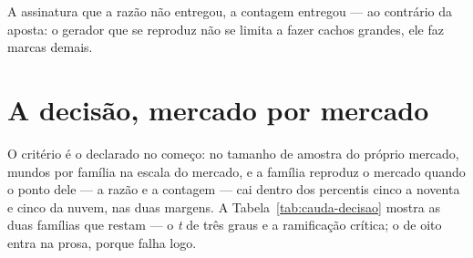 A assinatura que a razão não entregou, a contagem entregou --- ao contrário da aposta: o gerador
que se reproduz não se limita a fazer cachos grandes, ele faz marcas demais.

\section{A decisão, mercado por mercado}

O critério é o declarado no começo: no tamanho de amostra do próprio mercado, \numCaudaMundos{}
mundos por família na escala do mercado, e a família reproduz o mercado quando o ponto dele --- a
razão e a contagem --- cai dentro dos percentis cinco a noventa e cinco da nuvem, nas duas
margens. A Tabela~\ref{tab:cauda-decisao} mostra as duas famílias que restam --- o \emph{t} de
três graus e a ramificação crítica; o de oito entra na prosa, porque falha logo.


